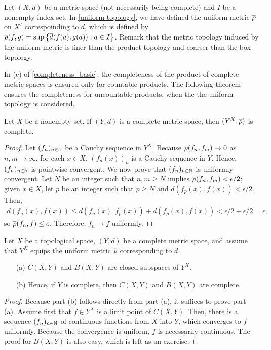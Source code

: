 Let $(X, d)$ be a metric space (not necessarily being complete) and $I$ be a nonempty index set.
In \cref{uniform topology}, we have defined the uniform metric $\overline{\rho}$ on $X^I$ correspoinding to $d$, which is defined by $\overline{\rho}(f, g)=\sup\left\{\overline{d}(f(a), g(a)): a\in I\right\}$.
Remark that the metric topology induced by the uniform metric is finer than the product topology and coarser than the box topology.

In (c) of \cref{completeness_basic}, the completeness of the product of complete metric spaces is ensured only for countable products.
The following theorem ensures the completeness for uncountable products, when the the uniform topology is considered.
\begin{thm}
    Let $X$ be a nonempty set.
    If $(Y, d)$ is a complete metric space, then $(Y^X, \overline{\rho})$ is complete.
\end{thm}
\begin{proof}
    Let $(f_n)_{n\in{\mathbb{N}}}$ be a Cauchy sequence in $Y^X$.
    Because $\overline{\rho}(f_n, f_m)\rightarrow 0$ as $n, m\rightarrow\infty$, for each $x\in X$, $(f_n(x))_n$ is a Cauchy sequence in $Y$.
    Hence, $(f_n)_{n\in{\mathbb{N}}}$ is pointwise convergent.
    We now prove that $(f_n)_{n\in{\mathbb{N}}}$ is uniformly convergent.
    Let $N$ be an integer such that $n, m\geq N$ implies $\overline{\rho}(f_n, f_m)<\epsilon/2$; given $x\in X$, let $p$ be an integer such that $p\geq N$ and $d(f_p(x), f(x))<\epsilon/2$.
    Then,
    \begin{align*}
        d(f_n(x), f(x))\leq d(f_n(x), f_p(x))+d(f_p(x), f(x))<\epsilon/2+\epsilon/2=\epsilon,
    \end{align*}
    so $\overline{\rho}(f_n, f)\leq\epsilon$.
    Therefore, $f_n\rightarrow f$ uniformly.
\end{proof}

\begin{thm}\label{Complete spaces of functions}
    Let $X$ be a topological space, $(Y, d)$ be a complete metric space, and assume that $Y^X$ equips the uniform metric $\overline{\rho}$ corresponding to $d$.
    \begin{enumerate}
        \item[(a)]
        {
            $C(X, Y)$ and $B(X, Y)$ are closed subspaces of $Y^X$.
        }
        \item[(b)]
        {
            Hence, if $Y$ is complete, then $C(X, Y)$ and $B(X, Y)$ are complete.
        }
    \end{enumerate}
\end{thm}
\begin{proof}
    Because part (b) follows directly from part (a), it suffices to prove part (a).
    Assume first that $f\in Y^X$ is a limit point of $C(X, Y)$.
    Then, there is a sequence $(f_n)_{n\in{\mathbb{N}}}$ of continuous functions from $X$ into $Y$, which converges to $f$ uniformly.
    Because the convergence is uniform, $f$ is necessarily continuous.
    The proof for $B(X, Y)$ is also easy, which is left as an exercise.
\end{proof}


